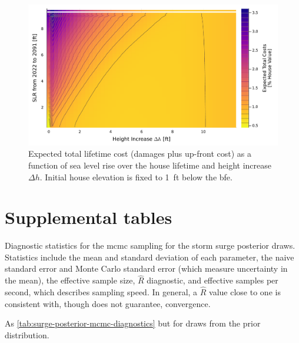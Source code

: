 \documentclass[12pt]{article}
\begin{document}
\begin{figure}
    \includegraphics[width=\textwidth]{scenario-map-height-slr}
    \caption{
        Expected total lifetime cost (damages plus up-front cost) as a function of sea level rise over the house lifetime and height increase $\Delta h$.
        Initial house elevation is fixed to \SI{1}{ft} below the \gls{bfe}.
    }\label{fig:scenario-map-height-slr}
\end{figure}

\section{Supplemental tables}

\begin{table}[h]
    \centering
    \caption{
        Diagnostic statistics for the \gls{mcmc} sampling for the storm surge posterior draws.
        Statistics include the mean and standard deviation of each parameter, the naive standard error and Monte Carlo standard error (which measure uncertainty in the mean), the effective sample size, $\hat{R}$ diagnostic, and effective samples per second, which describes sampling speed.
        In general, a $\hat{R}$ value close to one is consistent with, though does not guarantee, convergence.
    }\label{tab:surge-posterior-mcmc-diagnostics}
    
\end{table}

\begin{table}[h]
    \centering
    \caption{As \cref{tab:surge-posterior-mcmc-diagnostics} but for draws from the prior distribution.}\label{tab:surge-prior-mcmc-diagnostics}
    
\end{table}
\end{document}
